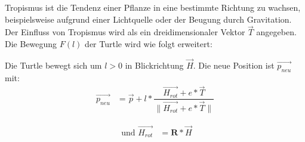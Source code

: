 Tropismus ist die Tendenz einer Pflanze in eine bestimmte Richtung zu wachsen, beispielsweise aufgrund einer Lichtquelle oder der Beugung durch Gravitation. \cite[Abschn. 3]{SpaceColonizationAlgorithm:07} Der Einfluss von Tropismus wird als ein dreidimensionaler Vektor $\overrightarrow{T}$ angegeben. Die Bewegung $F(l)$ der Turtle wird wie folgt erweitert:

\begin{description}[labelindent]
	\item[\boldmath$F(l)$]  Die Turtle bewegt sich um $l>0$ in Blickrichtung $\overrightarrow{H}$. Die neue Position ist $\overrightarrow{p_{neu}}$ mit:
	\begin{equation}
	\begin{array}{ll}
	\overrightarrow{p_{neu}} & = \overrightarrow{p} + l * \dfrac{\overrightarrow{H_{rot}} + e * \overrightarrow{T} }{\lVert \overrightarrow{H_{rot}} + e * \overrightarrow{T} \rVert} 
	\end{array}
	\end{equation} 
	
	\begin{equation}
	\begin{array}{ll}
	\text{ und } \overrightarrow{H_{rot}} & = \boldsymbol{R} * \overrightarrow{H}
	\end{array}
	\end{equation} 
	
\end{description}

